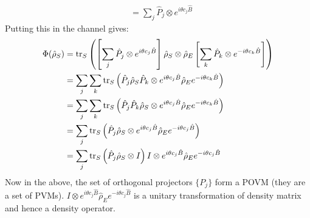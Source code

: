 \documentclass[12pt,a4]{article}
\begin{document}
\begin{enumerate}
\begin{enumerate}
\begin{align*}
          &= \sum_j \hat P_j \otimes e^{  i\theta c_j  \hat B}
      \end{align*}
      Putting this in the channel gives:
      \begin{align*}
        \Phi(\hat \rho_S) &= \tr_S\left(\left[\sum_j \hat P_j \otimes e^{  i\theta c_j  \hat B}\right] \hat \rho_S \otimes \hat \rho_E \left[\sum_k \hat P_k \otimes e^{ -i\theta c_k  \hat B}\right]\right)\\
                          &= \sum_j \sum_k \tr_S\left(\hat P_j   \hat \rho_S \hat P_k \otimes e^{  i\theta c_j  \hat B}\hat \rho_E  e^{- i\theta c_k  \hat B}\right)\\
                          &= \sum_j \sum_k \tr_S\left( \hat P_j \hat P_k \hat \rho_S \otimes e^{  i\theta c_j  \hat B}\hat \rho_E  e^{- i\theta c_k  \hat B}\right)\\
                          &= \sum_j \tr_S\left( \hat P_j \hat \rho_S  \otimes e^{  i\theta c_j  \hat B}\hat \rho_E  e^{- i\theta c_j  \hat B}\right)\\
                          &= \sum_j \tr_S\left( \hat P_j \hat \rho_S  \otimes I\right) I \otimes e^{  i\theta c_j  \hat B}\hat \rho_E  e^{- i\theta c_j  \hat B}
      \end{align*}
      Now in the above, the set of orthogonal projectors $\{P_j\}$ form a POVM (they are a set of PVMs).
      $I \otimes e^{  i\theta c_j  \hat B}\hat \rho_E  e^{- i\theta c_j  \hat B}$ is a unitary transformation of density matrix and hence a density operator.
    \end{enumerate}
\end{enumerate}
\end{document}
